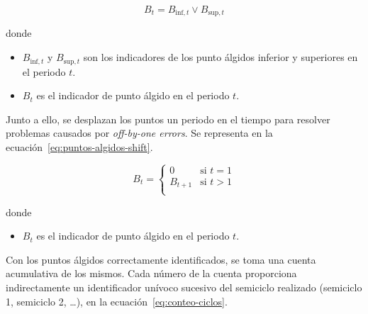 \begin{samepage}

  \begin{equation}%
    \label{eq:puntos-algidos}
    B_{t} = B_{\text{inf}, t} \lor B_{\text{sup}, t}
  \end{equation}

  donde

  \begin{itemize}

    \item \( B_{\text{inf}, t} \) y \( B_{\text{sup}, t} \) son los indicadores de los punto álgidos inferior y superiores en el periodo \( t \).

    \item \( B_{t} \) es el indicador de punto álgido en el periodo \( t \).

  \end{itemize}

\end{samepage}

Junto a ello, se desplazan los puntos un periodo en el tiempo para resolver problemas causados por \textit{off-by-one errors}. Se representa en la ecuación~\ref{eq:puntos-algidos-shift}.

\begin{samepage}

  \begin{equation}%
    \label{eq:puntos-algidos-shift}
    B_t =
    \begin{cases}
      0         & \text{si } t = 1 \\
      B_{t + 1} & \text{si } t > 1 \\
    \end{cases}
  \end{equation}

  donde

  \begin{itemize}

    \item \( B_{t} \) es el indicador de punto álgido en el periodo \( t \).

  \end{itemize}

\end{samepage}

Con los puntos álgidos correctamente identificados, se toma una cuenta acumulativa de los mismos. Cada número de la cuenta proporciona indirectamente un identificador unívoco sucesivo del semiciclo realizado (semiciclo 1, semiciclo 2, \ldots), en la ecuación~\ref{eq:conteo-ciclos}.

